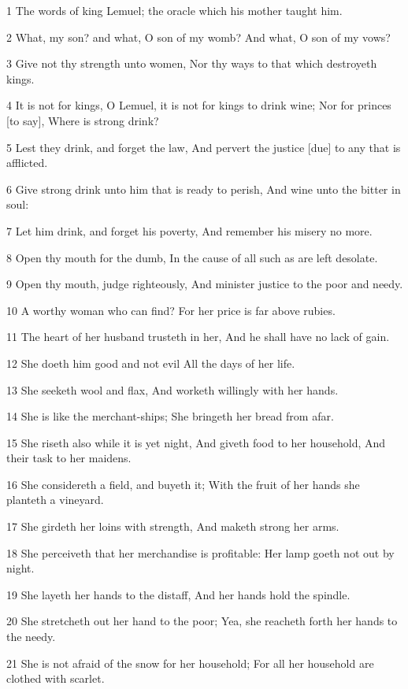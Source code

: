 \par 1 The words of king Lemuel; the oracle which his mother taught him.
\par 2 What, my son? and what, O son of my womb? And what, O son of my vows?
\par 3 Give not thy strength unto women, Nor thy ways to that which destroyeth kings.
\par 4 It is not for kings, O Lemuel, it is not for kings to drink wine; Nor for princes [to say], Where is strong drink?
\par 5 Lest they drink, and forget the law, And pervert the justice [due] to any that is afflicted.
\par 6 Give strong drink unto him that is ready to perish, And wine unto the bitter in soul:
\par 7 Let him drink, and forget his poverty, And remember his misery no more.
\par 8 Open thy mouth for the dumb, In the cause of all such as are left desolate.
\par 9 Open thy mouth, judge righteously, And minister justice to the poor and needy.
\par 10 A worthy woman who can find? For her price is far above rubies.
\par 11 The heart of her husband trusteth in her, And he shall have no lack of gain.
\par 12 She doeth him good and not evil All the days of her life.
\par 13 She seeketh wool and flax, And worketh willingly with her hands.
\par 14 She is like the merchant-ships; She bringeth her bread from afar.
\par 15 She riseth also while it is yet night, And giveth food to her household, And their task to her maidens.
\par 16 She considereth a field, and buyeth it; With the fruit of her hands she planteth a vineyard.
\par 17 She girdeth her loins with strength, And maketh strong her arms.
\par 18 She perceiveth that her merchandise is profitable: Her lamp goeth not out by night.
\par 19 She layeth her hands to the distaff, And her hands hold the spindle.
\par 20 She stretcheth out her hand to the poor; Yea, she reacheth forth her hands to the needy.
\par 21 She is not afraid of the snow for her household; For all her household are clothed with scarlet.
